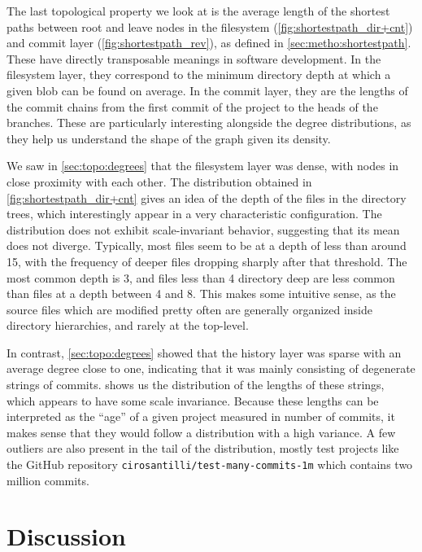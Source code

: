 The last topological property we look at is the average length of the shortest
paths between root and leave nodes in the filesystem
(\cref{fig:shortestpath_dir+cnt}) and commit layer
(\cref{fig:shortestpath_rev}), as defined in \cref{sec:metho:shortestpath}.
These have directly transposable meanings in software development. In the
filesystem layer, they correspond to the minimum directory depth at which a
given blob can be found on average. In the commit layer, they are the lengths
of the commit chains from the first commit of the project to the heads of the
branches.  These are particularly interesting alongside the degree
distributions, as they help us understand the shape of the graph given its
density.

We saw in \cref{sec:topo:degrees} that the filesystem layer was dense,
with nodes in close proximity with each other.  The distribution obtained in
\cref{fig:shortestpath_dir+cnt} gives an idea of the depth of the files in the
directory trees, which interestingly appear in a very characteristic
configuration. The distribution does not exhibit scale-invariant behavior,
suggesting that its mean does not diverge.  Typically, most files seem to be at
a depth of less than around 15, with the frequency of deeper files dropping
sharply after that threshold.  The most common depth is 3, and files less than
4 directory deep are less common than files at a depth between 4 and 8. This
makes some intuitive sense, as the source files which are modified pretty often
are generally organized inside directory hierarchies, and rarely at the
top-level.

In contrast, \cref{sec:topo:degrees} showed that the history layer was
sparse with an average degree close to one, indicating that it was mainly
consisting of degenerate strings of commits.  shows
us the distribution of the lengths of these strings, which appears to have some
scale invariance. Because these lengths can be interpreted as the ``age'' of a
given project measured in number of commits, it makes sense that they would
follow a distribution with a high variance.
A few outliers are also present in the tail of the distribution, mostly test
projects like the GitHub repository \texttt{cirosantilli/test-many-commits-1m}
which contains two million commits.

\section{Discussion}%
\label{sec:topology-discussion}

